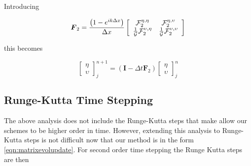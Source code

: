 Introducing 

\[\boldsymbol{F}_2 = \frac{\left(1 - e^{ik\Delta x}\right)}{\Delta x}\left[\begin{array}{c c}
\mathcal{F}_2^{\eta,\eta} & \mathcal{F}_2^{\eta,\upsilon} \\ \frac{1}{\mathcal{G}}\mathcal{F}_2^{\upsilon,\eta} &  \frac{1}{\mathcal{G}}\mathcal{F}_2^{\upsilon,\upsilon} 
\end{array}\right] \]

this becomes

\begin{equation*}
\label{eqn:matrixevolupdate}
\left[\begin{array}{c}
\eta \\ \upsilon
\end{array}\right]^{n+1}_j = \left(\boldsymbol{I}  - \Delta t \boldsymbol{F}_2 \right) \left[\begin{array}{c}
\eta \\ \upsilon
\end{array}\right]^{n}_j
\end{equation*}

\subsection{Runge-Kutta Time Stepping}
The above analysis does not include the Runge-Kutta steps that make allow our schemes to be higher order in time. However, extending this analysis to Runge-Kutta steps is not difficult now that our method is in the form \eqref{eqn:matrixevolupdate}. For second order time stepping the Runge Kutta steps are then

